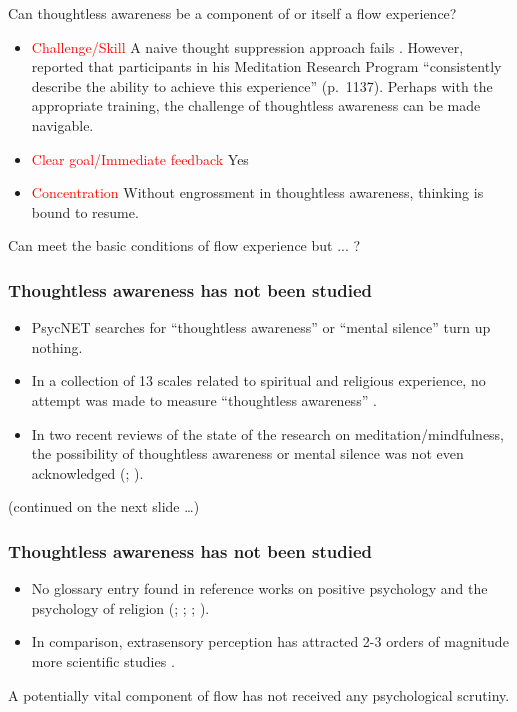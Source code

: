 \documentclass[10pt,utf8x]{beamer}
\begin{document}
\begin{frame}
Can thoughtless awareness be a component of or itself a flow experience? 

\begin{itemize}
\item \textcolor{red}{Challenge/Skill} A naive thought suppression approach fails \cite{wegner2003}.
However,  reported that participants in his
Meditation Research Program ``consistently describe the
ability to achieve this experience'' (p.~1137).
Perhaps with the appropriate training,
the challenge of thoughtless awareness can be made navigable.

\item \textcolor{red}{Clear goal/Immediate feedback} Yes

\item \textcolor{red}{Concentration} Without engrossment
in thoughtless awareness, thinking is bound to resume.

\end{itemize}

Can meet the basic conditions of flow experience but ... ?
\end{frame}

\begin{frame}
\frametitle{Thoughtless awareness has not been studied}

\begin{itemize}
\item PsycNET searches for ``thoughtless awareness'' or ``mental silence''
turn up nothing.
\item
In a collection of 13 scales related to spiritual and religious experience,
no attempt was made to measure ``thoughtless awareness'' \cite{fetzer1999}.
\item
In two recent reviews of the state of the research on meditation/mindfulness,
the possibility of thoughtless awareness or mental silence was not
even acknowledged (; ).
\end{itemize}

(continued on the next slide \dots)
\end{frame}

\begin{frame}
\frametitle{Thoughtless awareness has not been studied}
\begin{itemize}
\item
No glossary entry found in reference works on
positive psychology and the psychology of religion
(; ; ; ).
\item In comparison, extrasensory perception has attracted 2-3 orders of
magnitude more scientific studies \cite{lau2004}.
\end{itemize}

A potentially vital component of flow has not received
any psychological scrutiny.
\end{frame}
\end{document}
